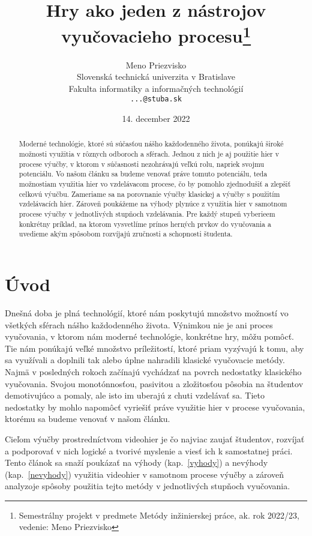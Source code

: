 \documentclass[10pt,twoside,slovak,a4paper]{article}
\title{Hry ako jeden z nástrojov vyučovacieho procesu\thanks{Semestrálny projekt v predmete Metódy inžinierskej práce, ak. rok 2022/23, vedenie: Meno Priezvisko}}
\author{Meno Priezvisko\\[2pt]
	{\small Slovenská technická univerzita v Bratislave}\\
	{\small Fakulta informatiky a informačných technológií}\\
	{\small \texttt{...@stuba.sk}}
	}
\date{\small 14. december 2022}
\begin{document}
\maketitle

\begin{abstract}

Moderné technológie, ktoré sú súčasťou nášho každodenného života, ponúkajú široké možnosti využitia v rôznych odboroch a sférach. Jednou z nich je aj použitie hier v procese výučby, v ktorom v súčasnosti nezohrávajú veľkú rolu, napriek svojmu potenciálu. Vo našom článku sa budeme venovať práve tomuto potenciálu, teda možnostiam využitia hier vo vzdelávacom procese, čo by pomohlo zjednodušiť a zlepšiť celkovú výučbu. Zameriame sa na porovnanie výučby klasickej a výučby s použitím vzdelávacích hier. Zároveň poukážeme na výhody plynúce z využitia hier v samotnom procese výučby v jednotlivých stupňoch vzdelávania. Pre každý stupeň vyberieem konkrétny príklad, na ktorom vysvetlíme prínos herných prvkov do vyučovania a uvedieme akým spôsobom rozvíjajú zručnosti a schopnosti študenta.

\end{abstract}


\section{Úvod}

Dnešná doba je plná technológií, ktoré nám poskytujú množstvo možností vo všetkých sférach nášho každodenného života. Výnimkou nie je ani proces vyučovania, v ktorom nám moderné technológie, konkrétne hry\cite{Zea2009-eh}, môžu pomôcť. Tie nám ponúkajú veľké množstvo príležitostí, ktoré priam vyzývajú k tomu, aby sa využívali a doplnili tak alebo úplne nahradili klasické vyučovacie metódy. Najmä v posledných rokoch začínajú vychádzať na povrch nedostatky klasického vyučovania. Svojou monotónnosťou, pasivitou a zložitosťou pôsobia na študentov demotivujúco a pomaly, ale isto im uberajú z chuti vzdelávať sa. Tieto nedostatky by mohlo napomôcť vyriešiť práve využitie hier v procese vyučovania, ktorému sa budeme venovať v našom článku. 

Cieľom výučby prostredníctvom videohier je čo najviac zaujať študentov, rozvíjať a podporovať v nich logické a tvorivé myslenie a viesť ich k samostatnej práci\cite{Chen2012-ao}. Tento článok sa snaží poukázať na výhody (kap.~\ref{vyhody}) a nevýhody (kap.~\ref{nevyhody}) využitia videohier v samotnom procese výučby a zároveň analyzoje spôsoby použitia tejto metódy v jednotlivých stupňoch vyučovania.
\end{document}

